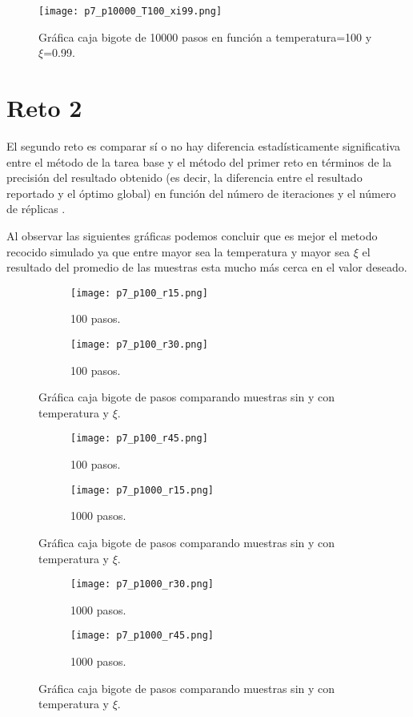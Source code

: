 \documentclass{article}
\begin{document}
\begin{figure}[H]
\centering
\texttt{[image: p7\_p10000\_T100\_xi99.png]}
\caption{\label{fig3} Gráfica caja bigote de 10000 pasos en función a temperatura=100 y $\xi$=0.99.}
\end{figure}


\section{Reto 2}
El segundo reto es comparar sí o no hay diferencia estadísticamente significativa entre el método de la tarea base y el método del primer reto en términos de la precisión del resultado obtenido (es decir, la diferencia entre el resultado reportado y el óptimo global) en función del número de iteraciones y el número de réplicas \cite{Satu_Elisa_Schaeffer}.

Al observar las siguientes gráficas podemos concluir que es mejor el metodo recocido simulado ya que entre mayor sea la temperatura y mayor sea $\xi$ el resultado del promedio de las muestras esta mucho más cerca en el valor deseado.

\begin{figure}[H]
\centering
\begin{subfigure}[b]{0.40\linewidth}
\texttt{[image: p7\_p100\_r15.png]}
\caption{100 pasos.}
\end{subfigure}
\begin{subfigure}[b]{0.40\linewidth}
\texttt{[image: p7\_p100\_r30.png]}
\caption{100 pasos.}
\end{subfigure}
\caption{Gráfica caja bigote de pasos comparando muestras sin y con temperatura y $\xi$.}
\label{fig:westminster}
\end{figure}

\begin{figure}[H]
\centering
\begin{subfigure}[b]{0.40\linewidth}
\texttt{[image: p7\_p100\_r45.png]}
\caption{100 pasos.}
\end{subfigure}
\begin{subfigure}[b]{0.40\linewidth}
\texttt{[image: p7\_p1000\_r15.png]}
\caption{1000 pasos.}
\end{subfigure}
\caption{Gráfica caja bigote de pasos comparando muestras sin y con temperatura y $\xi$.}
\label{fig:westminster}
\end{figure}

\begin{figure}[H]
\centering
\begin{subfigure}[b]{0.40\linewidth}
\texttt{[image: p7\_p1000\_r30.png]}
\caption{1000 pasos.}
\end{subfigure}
\begin{subfigure}[b]{0.40\linewidth}
\texttt{[image: p7\_p1000\_r45.png]}
\caption{1000 pasos.}
\end{subfigure}
\caption{Gráfica caja bigote de pasos comparando muestras sin y con temperatura y $\xi$.}
\label{fig:westminster}
\end{figure}
\end{document}
